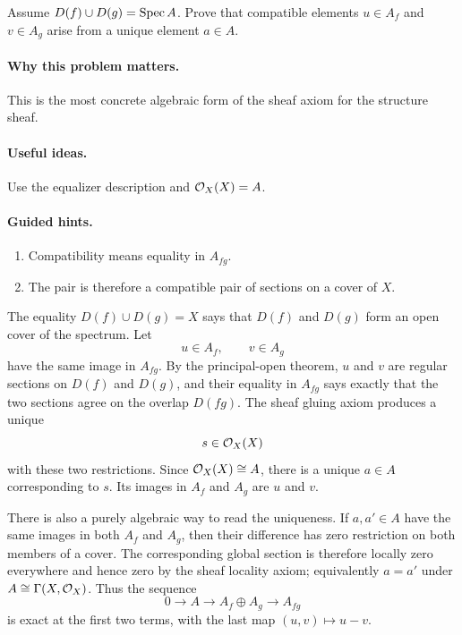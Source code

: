 \begin{problem}\label{prob:vi17-p20}
Assume $D(f)\cup D(g)=\operatorname{Spec} A$.  Prove that compatible elements $u\in A_f$ and $v\in A_g$ arise from a unique element $a\in A$.
\end{problem}

\ifdefined\FullProblemDossiers
\paragraph{Why this problem matters.}
This is the most concrete algebraic form of the sheaf axiom for the structure sheaf.

\paragraph{Useful ideas.}
Use the equalizer description and $\mathcal O_X(X)=A$.

\paragraph{Guided hints.}
\begin{enumerate}
\item Compatibility means equality in $A_{fg}$.
\item The pair is therefore a compatible pair of sections on a cover of $X$.
\end{enumerate}

\begin{solution}
The equality $D(f)\cup D(g)=X$ says that $D(f)$ and $D(g)$ form an open cover of the spectrum.  Let
\[
u\in A_f,
\qquad
v\in A_g
\]
have the same image in $A_{fg}$.  By the principal-open theorem, $u$ and $v$ are regular sections on $D(f)$ and $D(g)$, and their equality in $A_{fg}$ says exactly that the two sections agree on the overlap $D(fg)$.  The sheaf gluing axiom produces a unique
\[
s\in\mathcal O_X(X)
\]
with these two restrictions.  Since $\mathcal O_X(X)\cong A$, there is a unique $a\in A$ corresponding to $s$.  Its images in $A_f$ and $A_g$ are $u$ and $v$.

There is also a purely algebraic way to read the uniqueness.  If $a,a'\in A$ have the same images in both $A_f$ and $A_g$, then their difference has zero restriction on both members of a cover.  The corresponding global section is therefore locally zero everywhere and hence zero by the sheaf locality axiom; equivalently $a=a'$ under $A\cong\Gamma(X,\mathcal O_X)$.  Thus the sequence
\[
0\longrightarrow A\longrightarrow A_f\oplus A_g\longrightarrow A_{fg}
\]
is exact at the first two terms, with the last map $(u,v)\mapsto u-v$.
\end{solution}



